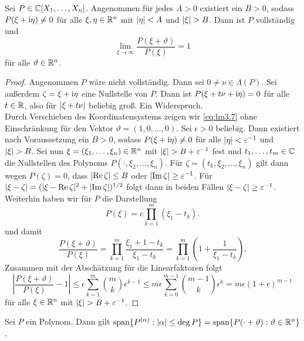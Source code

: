 \begin{lem}
Sei $P\in \mathbb C[X_1,\ldots,X_n]$. Angenommen für jedes $A>0$ existiert ein $B>0$, sodass $P(\xi+\mathrm i\eta)\neq 0$ für alle $\xi,\eta\in\mathbb R^n$ mit $\lvert\eta\rvert<A$ und $\lvert\xi\rvert>B$. Dann ist $P$ vollständig und
\begin{equation}
\lim_{\xi\to\infty}\dfrac{P(\xi+\vartheta)}{P(\xi)}=1 \label{eq:lm3.7}
\end{equation}
für alle $ \vartheta\in\mathbb R^n$.
\end{lem}
\begin{proof}
Angenommen $P$ wäre nicht vollständig. Dann sei $0\neq\nu\in\Lambda(P)$. Sei außerdem $\zeta=\xi+\mathrm i\eta$ eine Nullstelle von $P$. Dann ist $P(\xi+t\nu+\mathrm i\eta)=0$ für alle $t\in\mathbb R$, also für $\lvert\xi+t\nu\rvert$ beliebig groß. Ein Widerspruch.\\
Durch Verschieben des Koordinatensystems zeigen wir \ref{eq:lm3.7} ohne Einschränkung für den Vektor $\vartheta=(1,0,\ldots,0)$. Sei $\epsilon > 0$ beliebig. Dann existiert nach Voraussetzung ein $B>0$, sodass $P(\xi+\mathrm i\eta)\neq 0$ für alle $\lvert\eta\rvert < \varepsilon^{-1}$ und $\lvert\xi\rvert>B$. Sei nun $\xi=(\xi_1,\ldots,\xi_n)\in\mathbb R^n$ mit $\lvert\xi\rvert>B+\varepsilon^{-1}$ fest und $t_1,\ldots,t_m\in \mathbb C$ die Nullstellen des Polynoms $P(\cdot,\xi_2,\ldots,\xi_n)$. Für $\zeta=(t_k,\xi_2,\ldots,\xi_n)$ gilt dann wegen $P(\zeta)=0$, dass $\lvert\operatorname{Re} \zeta\rvert \leq B$ oder $\lvert\operatorname{Im} \zeta\rvert \geq \varepsilon^{-1}$. Für $\lvert\xi-\zeta\rvert= (\lvert\xi-\operatorname{Re} \zeta\rvert^2+\lvert\operatorname{Im} \zeta\rvert)^{1/2}$ folgt dann in beiden Fällen $\lvert\xi-\zeta\rvert\geq \varepsilon^{-1}$. Weiterhin haben wir für $P$ die Darstellung
\begin{equation}
P(\xi)=c\prod_{k=1}^m (\xi_1-t_k).
\end{equation}
und damit
\begin{equation}
\dfrac{P(\xi+\vartheta)}{P(\xi)}=\prod_{k=1}^m \dfrac{\xi_1+1-t_k}{\xi_1-t_k}=\prod_{k=1}^m\left( 1+\dfrac{1}{\xi_1-t_k} \right).
\end{equation}
Zusammen mit der Abschätzung für die Linearfaktoren folgt
\begin{equation}
\left|\dfrac{P(\xi+\vartheta)}{P(\xi)}-1\right|\leq \epsilon\sum_{k=1}^m \binom{m}{k}\epsilon^{k-1} \leq m\epsilon  \sum_{k=0}^{m-1}\binom{m-1}{k}\epsilon^k = m\epsilon(1+\epsilon)^{m-1}
\end{equation}
für alle $\xi \in\mathbb R^n$ mit $\lvert\xi\rvert>B+\varepsilon^{-1}$.
\end{proof}
\begin{lem}
Sei $P$ ein Polynom. Dann gilt $\operatorname{span}\{P^{(\alpha)}:\lvert\alpha\rvert\leq \deg P\}=\operatorname{span}\{P(\cdot+\vartheta):\vartheta\in\mathbb R^n\}$.
\end{lem}
